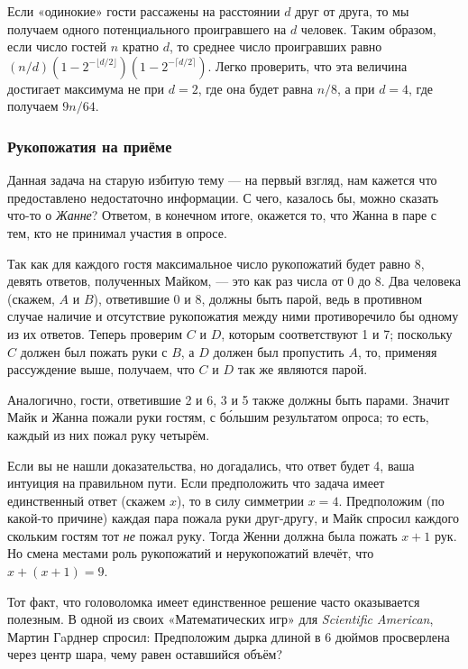 Если «одинокие» гости рассажены на расстоянии $d$ друг от друга, то мы получаем одного потенциального проигравшего на $d$ человек.
Таким образом, если число гостей $n$ кратно $d$, то среднее число проигравших равно $(n/d)(1-2^{-\lfloor d/2\rfloor})(1-2^{-\lceil d/2\rceil})$.
Легко проверить, что эта величина достигает максимума не при $d=2$, где она будет равна $n/8$, а при $d=4$, где получаем $9n/64$.
\heart

\subsubsection*{Рукопожатия на приёме}%

Данная задача на старую избитую тему --- на первый взгляд, нам кажется что предоставлено недостаточно информации.
С чего, казалось бы, можно сказать что-то о \emph{Жанне}?
Ответом, в конечном итоге, окажется то, что Жанна в паре с тем, кто не принимал участия в опросе.

Так как для каждого гостя максимальное число рукопожатий будет равно 8, 
девять ответов, полученных Майком, --- это как раз числа от 0 до 8.
Два человека (скажем, $A$ и $B$), ответившие 0 и 8, должны быть парой, ведь в противном случае наличие и отсутствие рукопожатия между ними противоречило бы одному из их ответов.
Теперь проверим $C$ и $D$, которым соответствуют 1 и 7;
поскольку $C$ должен был пожать руки с $B$, а $D$ должен был пропустить $A$, то, применяя рассуждение выше, получаем, что $C$ и $D$ так же являются парой.

Аналогично, гости, ответившие 2 и 6, 3 и 5 также должны быть парами.
Значит Майк и Жанна пожали руки гостям, с б\'{о}льшим результатом опроса;
то есть, каждый из них пожал руку четырём.
\heart

Если вы не нашли доказательства, но догадались, что ответ будет 4, ваша интуиция на правильном пути.
Если предположить что задача имеет единственный ответ (скажем $x$), то в силу симметрии $x=4$.
Предположим (по какой-то причине) каждая пара пожала руки друг-другу, и Майк спросил каждого скольким гостям тот \emph{не} пожал руку.
Тогда Женни должна была пожать $x+1$ рук.
Но смена местами роль рукопожатий и нерукопожатий влечёт, что $x+(x+1)=9$.

Тот факт, что головоломка имеет единственное решение часто оказывается полезным.
В одной из своих «Математических игр» для \emph{Scientific American}, Мартин Гaрднер спросил:
Предположим дырка длиной в 6 дюймов просверлена через центр шара, чему равен оставшийся объём?


